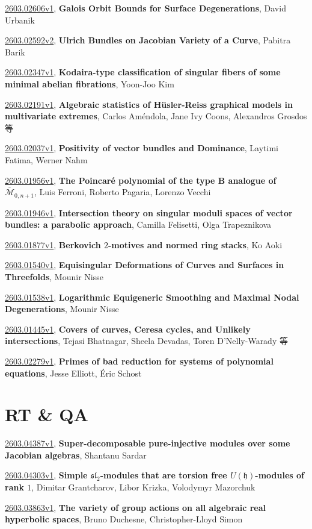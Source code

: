 \documentclass[9pt, a4paper]{article}
\theoremstyle{plain}
\theoremstyle{definition}
\theoremstyle{remark}
\newcommand{\arxiv}[3]{\href{https://arxiv.org/abs/#1}{#1}, \textbf{\textcolor{arxivblue}{#2}}, #3}
\begin{document}
\arxiv{2603.02606v1}{Galois Orbit Bounds for Surface Degenerations}{David Urbanik}

\arxiv{2603.02592v2}{Ulrich Bundles on Jacobian Variety of a Curve}{Pabitra Barik}

\arxiv{2603.02347v1}{Kodaira-type classification of singular fibers of some minimal abelian fibrations}{Yoon-Joo Kim}

\arxiv{2603.02191v1}{Algebraic statistics of Hüsler-Reiss graphical models in multivariate extremes}{Carlos Améndola, Jane Ivy Coons, Alexandros Grosdos 等}

\arxiv{2603.02037v1}{Positivity of vector bundles and Dominance}{Laytimi Fatima, Werner Nahm}

\arxiv{2603.01956v1}{The Poincaré polynomial of the type B analogue of $\overline{\mathcal{M}}_{0,n+1}$}{Luis Ferroni, Roberto Pagaria, Lorenzo Vecchi}

\arxiv{2603.01946v1}{Intersection theory on singular moduli spaces of vector bundles: a parabolic approach}{Camilla Felisetti, Olga Trapeznikova}

\arxiv{2603.01877v1}{Berkovich $2$-motives and normed ring stacks}{Ko Aoki}

\arxiv{2603.01540v1}{Equisingular Deformations of Curves and Surfaces in Threefolds}{Mounir Nisse}

\arxiv{2603.01538v1}{Logarithmic Equigeneric Smoothing and Maximal Nodal Degenerations}{Mounir Nisse}

\arxiv{2603.01445v1}{Covers of curves, Ceresa cycles, and Unlikely intersections}{Tejasi Bhatnagar, Sheela Devadas, Toren D'Nelly-Warady 等}

\arxiv{2603.02279v1}{Primes of bad reduction for systems of polynomial equations}{Jesse Elliott, Éric Schost}


\section{RT \& QA}
\arxiv{2603.04387v1}{Super-decomposable pure-injective modules over some Jacobian algebras}{Shantanu Sardar}

\arxiv{2603.04303v1}{Simple $\mathfrak{sl}_2$-modules that are torsion free $U(\mathfrak{h})$-modules of rank $1$}{Dimitar Grantcharov, Libor Krizka, Volodymyr Mazorchuk}

\arxiv{2603.03863v1}{The variety of group actions on all algebraic real hyperbolic spaces}{Bruno Duchesne, Christopher-Lloyd Simon}
\end{document}
